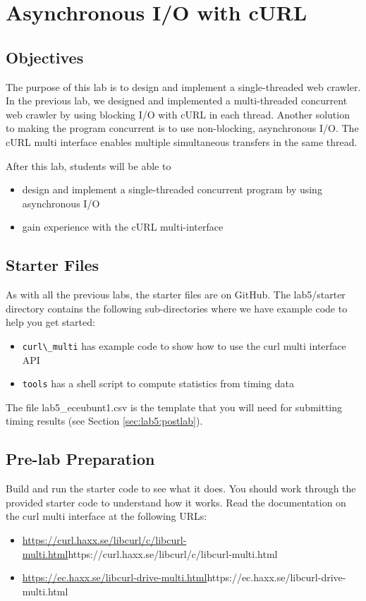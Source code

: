 \chapter{Asynchronous I/O with cURL}

\section{Objectives}
The purpose of this lab is to design and implement a single-threaded web crawler. In the previous lab, we designed and implemented a multi-threaded concurrent web crawler by using blocking I/O with cURL in each thread. Another solution to making the program concurrent is to use non-blocking, asynchronous I/O. The cURL multi interface enables multiple simultaneous transfers in the same thread.


After this lab, students will be able to
\begin{itemize}
\item design and implement a single-threaded concurrent program by using asynchronous I/O
\item gain experience with the cURL multi-interface
\end{itemize}

\section{Starter Files}
As with all the previous labs, the starter files are on GitHub. The lab5/starter directory contains the following sub-directories where we have example code to help you get started:

\begin{itemize}
\item \verb+curl\_multi+ has example code to show how to use the curl multi interface API
\item \verb+tools+ has a shell script to compute statistics from timing data
\end{itemize}
The file lab5\_eceubunt1.csv is the template that you will need for submitting timing results (see Section \ref{sec:lab5:postlab}).

\section{Pre-lab Preparation}
Build and run the starter code to see what it does. You should work through the provided starter code to understand how it works. 
Read the documentation on the curl multi interface at the following URLs:
  \begin{itemize}
  \item \url{https://curl.haxx.se/libcurl/c/libcurl-multi.html}{https://curl.haxx.se/libcurl/c/libcurl-multi.html}
  \item \url{https://ec.haxx.se/libcurl-drive-multi.html}{https://ec.haxx.se/libcurl-drive-multi.html}
  \end{itemize}

